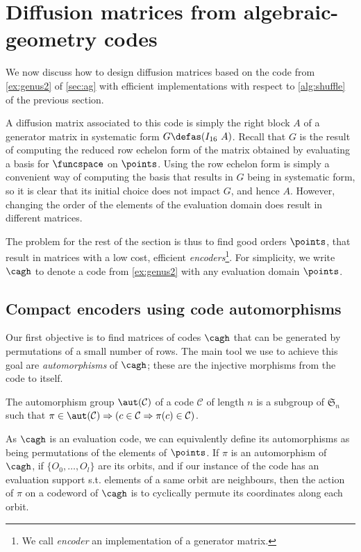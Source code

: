 \section{Diffusion matrices from algebraic-geometry codes}
\label{matt}

We now discuss how to design diffusion matrices based on the code from \autoref{ex:genus2} of \autoref{sec:ag}
with efficient implementations with respect to \autoref{alg:shuffle} of the previous section.

A diffusion matrix associated to this code is simply the right block $A$ of a generator matrix in systematic form $G \defas (I_{16}~A)$.
Recall that $G$ is the result of computing the reduced row echelon form of the matrix obtained by evaluating a basis for $\funcspace$
on $\points$. Using the row echelon form is simply a convenient way of computing the basis that results in $G$ being in systematic
form, so it is clear that its initial choice does not impact $G$, and hence $A$.
However, changing the order of the elements of the evaluation domain does result in different matrices.

The problem for the rest of the section is thus to find good orders $\points$,
that result in matrices with a low cost, \ie efficient \emph{encoders}\footnote{We call \emph{encoder} an implementation of a generator matrix.}.
For simplicity, we write $\cagh$ to denote a code from \autoref{ex:genus2} with any evaluation domain $\points$.


\subsection{Compact encoders using code automorphisms}
\label{sec:autos}

Our first objective is to find matrices of codes $\cagh$ that can be generated by permutations of a small number of rows.
The main tool we use to achieve this goal are \emph{automorphisms} of $\cagh$; these are the injective morphisms from the code to itself.
\begin{defi}
The automorphism group $\aut(\mathcal{C})$ of a code $\mathcal{C}$ of length $n$ is a subgroup of $\mathfrak{S}_n$ such that
$\pi \in \aut(\mathcal{C}) \Rightarrow (c \in \mathcal{C} \Rightarrow \pi(c) \in \mathcal{C})$.
\end{defi}

As $\cagh$ is an evaluation code, we can equivalently define its automorphisms as being permutations of the elements of $\points$.
If $\pi$ is an automorphism of $\cagh$, if $\{O_0, \ldots, O_l\}$ are its orbits, and if our instance of the code
has an evaluation support s.t. elements of a same orbit are neighbours,
then the action of $\pi$ on a codeword of $\cagh$
is to cyclically permute its coordinates along each orbit.

